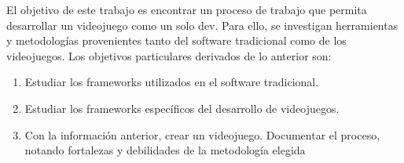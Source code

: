 El objetivo de este trabajo es encontrar un proceso de trabajo que permita desarrollar un videojuego como un solo dev. Para ello, se investigan herramientas y metodologías provenientes tanto del software tradicional como de los videojuegos.
\bigbreak
Los objetivos particulares derivados de lo anterior son:
\begin{enumerate}    
    \item Estudiar los frameworks utilizados en el software tradicional.
    \item Estudiar los frameworks específicos del desarrollo de videojuegos.
    \item Con la información anterior, crear un videojuego. Documentar el proceso, notando fortalezas y debilidades de la metodología elegida
\end{enumerate}




